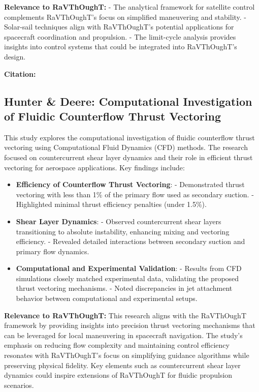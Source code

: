 \textbf{Relevance to RaVThOughT:}
- The analytical framework for satellite control complements RaVThOughT’s focus on simplified maneuvering and stability.
- Solar-sail techniques align with RaVThOughT’s potential applications for spacecraft coordination and propulsion.
- The limit-cycle analysis provides insights into control systems that could be integrated into RaVThOughT's design.

\textbf{Citation:}

\subsection{Hunter \& Deere: Computational Investigation of Fluidic Counterflow Thrust Vectoring}

This study explores the computational investigation of fluidic counterflow thrust vectoring using Computational Fluid Dynamics (CFD) methods. The research focused on countercurrent shear layer dynamics and their role in efficient thrust vectoring for aerospace applications. Key findings include:

\begin{itemize}
  \item \textbf{Efficiency of Counterflow Thrust Vectoring}:
  - Demonstrated thrust vectoring with less than 1\% of the primary flow used as secondary suction.
  - Highlighted minimal thrust efficiency penalties (under 1.5\%).

  \item \textbf{Shear Layer Dynamics}:
  - Observed countercurrent shear layers transitioning to absolute instability, enhancing mixing and vectoring efficiency.
  - Revealed detailed interactions between secondary suction and primary flow dynamics.

  \item \textbf{Computational and Experimental Validation}:
  - Results from CFD simulations closely matched experimental data, validating the proposed thrust vectoring mechanisms.
  - Noted discrepancies in jet attachment behavior between computational and experimental setups.
\end{itemize}

\textbf{Relevance to RaVThOughT:}
This research aligns with the RaVThOughT framework by providing insights into precision thrust vectoring mechanisms that can be leveraged for local maneuvering in spacecraft navigation. The study’s emphasis on reducing flow complexity and maintaining control efficiency resonates with RaVThOughT’s focus on simplifying guidance algorithms while preserving physical fidelity. Key elements such as countercurrent shear layer dynamics could inspire extensions of RaVThOughT for fluidic propulsion scenarios.

